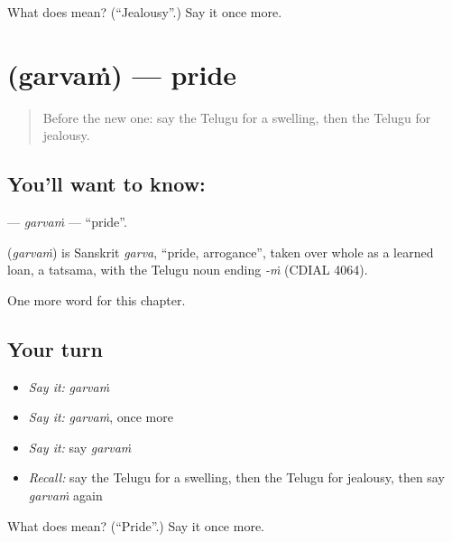 \begin{tcolorbox}[breakable,colback=teal!4,colframe=teal!35!black,title={Before you move on}]
What does  mean? (\textquotedblleft{}Jealousy\textquotedblright{}.) Say it once more.
\end{tcolorbox}
\section[\texorpdfstring{\te{గర్వం} (garvaṁ)}{గర్వం (garvaṁ)}]{ (garvaṁ) — pride}

\label{lesson:TE-C168-garvam}



\begin{quote}
Before the new one: say the Telugu for a swelling, then the Telugu for jealousy.
\end{quote}

\subsection*{You'll want to know: }
\textbf{} — \emph{garvaṁ} — \textquotedblleft{}pride\textquotedblright{}.

\begin{cousinweb}
\textbf{} (\emph{garvaṁ}) is Sanskrit \emph{garva}, \textquotedblleft{}pride, arrogance\textquotedblright{}, taken over whole as a learned loan, a tatsama, with the Telugu noun ending \emph{-ṁ} (CDIAL 4064).
\end{cousinweb}

\begin{grammarlens}[title={What you've built}]
One more word for this chapter.
\end{grammarlens}

\subsection*{Your turn}
\begin{itemize}
\raggedright
  \item \emph{Say it:} \emph{garvaṁ}
  \item \emph{Say it:} \emph{garvaṁ}, once more
  \item \emph{Say it:} say \emph{garvaṁ}
  \item \emph{Recall:} say the Telugu for a swelling, then the Telugu for jealousy, then say \emph{garvaṁ} again
\end{itemize}

\begin{tcolorbox}[breakable,colback=teal!4,colframe=teal!35!black,title={Before you move on}]
What does  mean? (\textquotedblleft{}Pride\textquotedblright{}.) Say it once more.
\end{tcolorbox}
